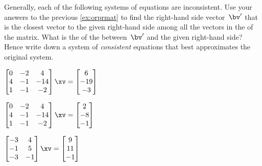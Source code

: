 \begin{exercise} \label{ex:aicebcb} 
Generally, each of the following systems of equations are inconsistent.
Use your answers to the previous \cref{ex:orprmat} to find the right-hand side vector~\(\bv'\) that is the closest vector to the given right-hand side among all the vectors in the  of the matrix.  
What is the  of the  between~\(\bv'\) and the given right-hand side?
Hence write down a system of \emph{consistent} equations that best approximates the original system.
\begin{Parts}
\item \(\begin{bmatrix} 0&-2&4
\\4&-1&-14
\\1&-1&-2 \end{bmatrix}\xv
=\begin{bmatrix} 6\\-19\\-3 \end{bmatrix}\)

\item \(\begin{bmatrix} 0&-2&4
\\4&-1&-14
\\1&-1&-2 \end{bmatrix}\xv
=\begin{bmatrix} 2\\-8\\-1 \end{bmatrix}\)

\item \(\begin{bmatrix} -3&4
\\-1&5
\\-3&-1 \end{bmatrix}\xv
=\begin{bmatrix} 9\\11\\-1 \end{bmatrix}\)


\end{Parts}
\end{exercise}
